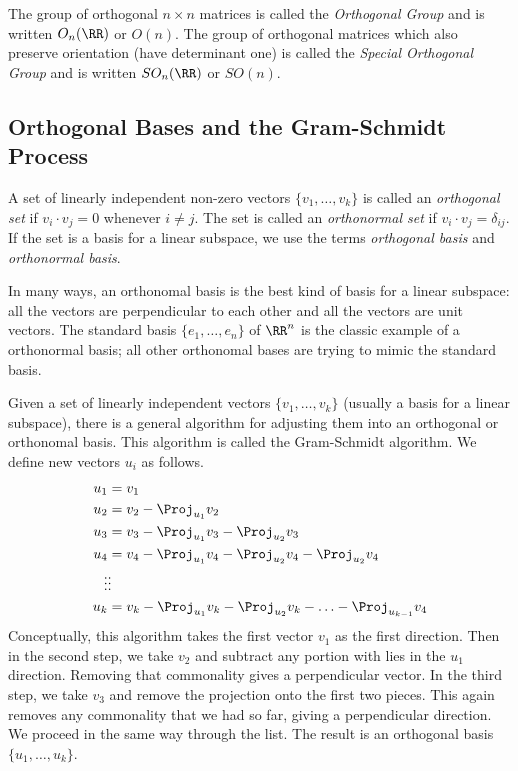 \documentclass[fleqn]{report}
\begin{document}
\begin{defn}
The group of orthogonal $n \times n$ matrices is called the
\emph{Orthogonal Group} and is written $O_n(\RR)$ or 
$O(n)$. The group of
orthogonal matrices which also preserve orientation (have
determinant one) is called the \emph{Special
Orthogonal Group} and is written $SO_n(\RR)$ or $SO(n)$.
\end{defn}

\subsection{Orthogonal Bases and the Gram-Schmidt Process}
\label{orthogonal-bases}

\begin{defn}
A set of linearly independent non-zero vectors $\{ v_1,
\ldots, v_k\}$ is called an \emph{orthogonal set} if $v_i
\cdot v_j = 0$ whenever $i \neq j$. The set is called an
\emph{orthonormal set} if $v_i \cdot v_j = \delta_{ij}$. If
the set is a basis for a linear subspace, we use the terms
\emph{orthogonal basis} and \emph{orthonormal basis}.
\end{defn}

In many ways, an orthonomal basis is the best kind of basis
for a linear subspace: all the vectors are perpendicular to
each other and all the vectors are unit vectors. The standard
basis $\{e_1, \ldots, e_n\}$ of $\RR^n$ is the classic example
of a orthonormal basis; all other orthonomal bases are trying
to mimic the standard basis.

Given a set of linearly independent vectors $\{v_1, \ldots,
v_k\}$ (usually a basis for a linear subspace), there is a
general algorithm for adjusting them into an orthogonal or
orthonomal basis. This algorithm is called the Gram-Schmidt
algorithm. We define new vectors $u_i$ as follows.
\begin{align*}
u_1 & = v_1 \\
u_2 & = v_2 - \Proj_{u_1} v_2 \\
u_3 & = v_3 - \Proj_{u_1} v_3 - \Proj_{u_2} v_3 \\
u_4 & = v_4 - \Proj_{u_1} v_4 - \Proj_{u_2} v_4 - \Proj_{u_2} v_4 \\
\vdots & \vdots \\
u_k & = v_k - \Proj_{u_1} v_k - \Proj_{u_2} v_k - \ldots -
\Proj_{u_{k-1}} v_4 
\end{align*}
Conceptually, this algorithm takes the first vector $v_1$ as
the first direction. Then in the second step, we take $v_2$
and subtract any portion with lies in the $u_1$ direction.
Removing that commonality gives a perpendicular vector. In
the third step, we take $v_3$ and remove the projection onto
the first two pieces. This again removes any commonality that
we had so far, giving a perpendicular direction. We proceed
in the same way through the list. The result is an orthogonal
basis $\{u_1, \ldots, u_k\}$. 
\end{document}
